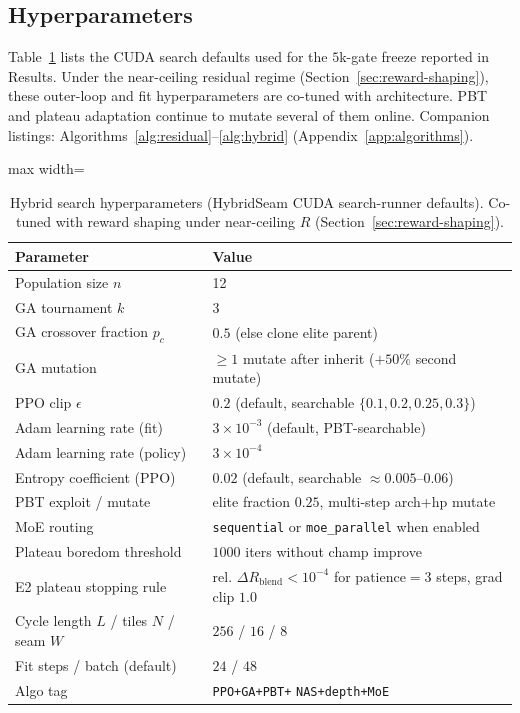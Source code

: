 \subsection{Hyperparameters}
\label{sec:hyperparams}

Table~\ref{tab:hyperparams} lists the CUDA search defaults used for the $5$k-gate freeze reported in Results.
Under the near-ceiling residual regime (Section~\ref{sec:reward-shaping}), these outer-loop and fit hyperparameters are co-tuned with architecture. PBT and plateau adaptation continue to mutate several of them online.
Companion listings: Algorithms~\ref{alg:residual}--\ref{alg:hybrid} (Appendix~\ref{app:algorithms}).

\begin{table}[t]
  \centering
  \small
  \caption{Hybrid search hyperparameters (HybridSeam CUDA search-runner defaults). Co-tuned with reward shaping under near-ceiling $R$ (Section~\ref{sec:reward-shaping}).}
  \label{tab:hyperparams}
  \setlength{\tabcolsep}{3pt}
  \begin{adjustbox}{max width=\columnwidth}
\begin{tabular}{@{}lp{}@{}}
    \toprule
    Parameter & Value \\
    \midrule
    Population size $n$ & 12 \\
    GA tournament $k$ & 3 \\
    GA crossover fraction $p_c$ & $0.5$ (else clone elite parent) \\
    GA mutation & $\ge 1$ mutate after inherit ($+50\%$ second mutate) \\
    PPO clip $\epsilon$ & $0.2$ (default, searchable $\{0.1,0.2,0.25,0.3\}$) \\
    Adam learning rate (fit) & $3{\times}10^{-3}$ (default, PBT-searchable) \\
    Adam learning rate (policy) & $3{\times}10^{-4}$ \\
    Entropy coefficient (PPO) & $0.02$ (default, searchable $\approx 0.005$--$0.06$) \\
    PBT exploit / mutate & elite fraction $0.25$, multi-step arch+hp mutate \\
    MoE routing & \texttt{sequential} or \texttt{moe\_parallel} when enabled \\
    Plateau boredom threshold & $1000$ iters without champ improve \\
    E2 plateau stopping rule & $\text{rel.\ }\Delta R_{\mathrm{blend}}<10^{-4}$ for $\text{patience}{=}3$ steps, grad clip $1.0$ \\
    Cycle length $L$ / tiles $N$ / seam $W$ & $256$ / $16$ / $8$ \\
    Fit steps / batch (default) & $24$ / $48$ \\
    Algo tag & \texttt{PPO+GA+PBT+} \texttt{NAS+depth+MoE} \\
    \bottomrule
  \end{tabular}
\end{adjustbox}
\end{table}
